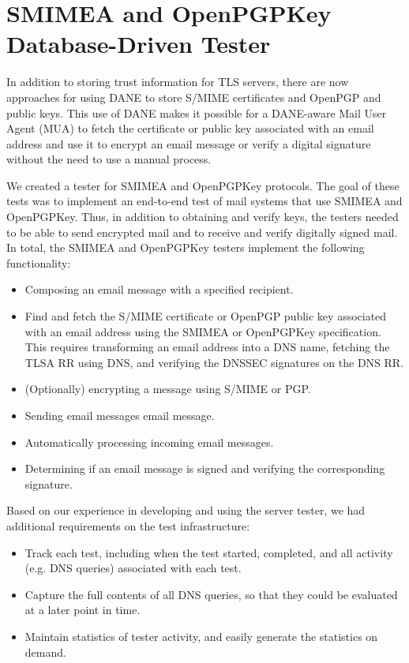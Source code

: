 \documentclass[preprint,3p,11pt]{elsarticle}
\begin{document}
\section{SMIMEA and OpenPGPKey Database-Driven Tester}
In addition to storing trust information for TLS servers, there are
now approaches for using DANE to store S/MIME certificates and OpenPGP
and public keys. This use of DANE makes it possible for a DANE-aware
Mail User Agent (MUA) to fetch the certificate or public key associated
with an email address and use it to encrypt an email message or verify
a digital signature without the need to use a manual
process.

We created a tester for SMIMEA and OpenPGPKey protocols. The goal of
these tests was to implement an end-to-end test of mail systems that
use SMIMEA and OpenPGPKey. Thus, in addition to obtaining and verify
keys, the testers needed to be able to send encrypted mail and to
receive and verify digitally signed mail. In total, the 
SMIMEA and OpenPGPKey testers implement the following functionality:

\begin{itemize}
\item Composing an email message with a specified recipient. 
\item Find and fetch the S/MIME certificate or OpenPGP public
  key associated with an email address using the SMIMEA or OpenPGPKey
  specification. This requires transforming an email address into a
  DNS name, fetching the TLSA RR using DNS, and verifying the DNSSEC
  signatures on the DNS RR.
\item (Optionally) encrypting a message using S/MIME or PGP.
\item Sending email messages email message. 
\item Automatically processing incoming email messages.
\item Determining if an email message is signed and verifying the
  corresponding signature. 
\end{itemize}

\noindent Based on our experience in developing and using the server tester, we
had additional requirements on the test infrastructure:

\begin{itemize}
\item Track each test, including when the test started, completed, and
  all activity (e.g. DNS queries) associated with each test.
\item Capture the full contents of all DNS queries, so that they could
  be evaluated at a later point in time.
\item Maintain statistics of tester activity, and easily generate the
  statistics on demand.
\end{itemize}
\end{document}
